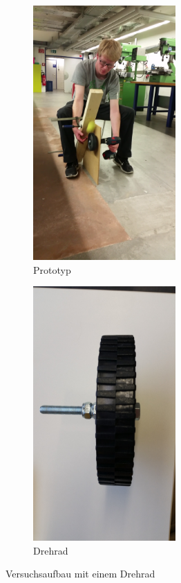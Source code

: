 \begin{figure}[h!]
	\centering
	\begin{subfigure}{.4\textwidth}
		\centering
		\includegraphics[width=0.6\textwidth]{../../fig/Versuch_Drehrad.png}
		\caption{Prototyp}
		\label{fig:Aufbau der Versuch}
	\end{subfigure} %
	\begin{subfigure}{.4\textwidth}
		\centering
		\includegraphics[width=0.6\textwidth]{../../fig/Drehrad_1.jpg}
		\caption{Drehrad}
		\label{fig:Drehrad}
	\end{subfigure}
	\caption{Versuchsaufbau mit einem Drehrad}
	\label{Drehrad Versuch}
\end{figure}
